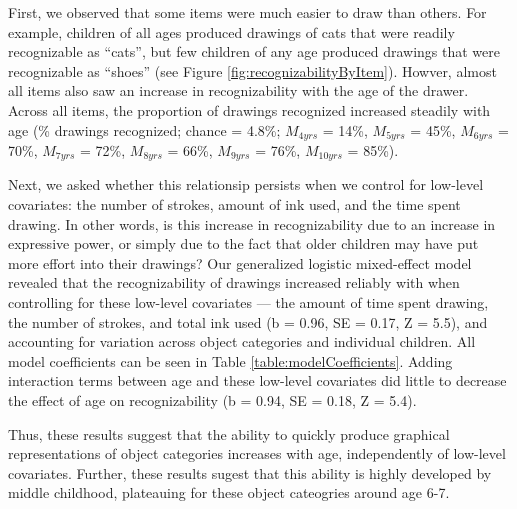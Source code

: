 \documentclass[10pt, letterpaper]{article}
\begin{document}
First, we observed that some items were much easier to draw than others.
For example, children of all ages produced drawings of cats that were
readily recognizable as ``cats'', but few children of any age produced
drawings that were recognizable as ``shoes'' (see Figure
\ref{fig:recognizabilityByItem}). Howver, almost all items also saw an
increase in recognizability with the age of the drawer. Across all
items, the proportion of drawings recognized increased steadily with age
(\% drawings recognized; chance = 4.8\%; \(M_{4yrs}\) = 14\%,
\(M_{5yrs}\) = 45\%, \(M_{6yrs}\) = 70\%, \(M_{7yrs}\) = 72\%,
\(M_{8yrs}\) = 66\%, \(M_{9yrs}\) = 76\%, \(M_{10yrs}\) = 85\%).

Next, we asked whether this relationsip persists when we control for
low-level covariates: the number of strokes, amount of ink used, and the
time spent drawing. In other words, is this increase in recognizability
due to an increase in expressive power, or simply due to the fact that
older children may have put more effort into their drawings? Our
generalized logistic mixed-effect model revealed that the
recognizability of drawings increased reliably with when controlling for
these low-level covariates --- the amount of time spent drawing, the
number of strokes, and total ink used (b = 0.96, SE = 0.17, Z = 5.5),
and accounting for variation across object categories and individual
children. All model coefficients can be seen in Table
\ref{table:modelCoefficients}. Adding interaction terms between age and
these low-level covariates did little to decrease the effect of age on
recognizability (b = 0.94, SE = 0.18, Z = 5.4).

Thus, these results suggest that the ability to quickly produce
graphical representations of object categories increases with age,
independently of low-level covariates. Further, these results sugest
that this ability is highly developed by middle childhood, plateauing
for these object cateogries around age 6-7.
\end{document}
